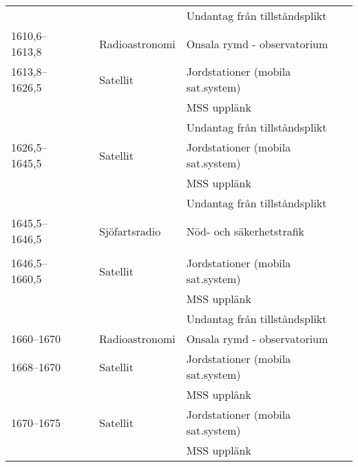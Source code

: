 \begin{landscape}
\begin{longtable}{llll}
	                   &                    &                         & Undantag från tillståndsplikt         \\
	1610,6--1613,8     &                    & Radioastronomi          & Onsala rymd - observatorium           \\
	1613,8--1626,5     &                    & Satellit                & Jordstationer (mobila sat.system)     \\
	                   &                    &                         & MSS upplänk                           \\
	                   &                    &                         & Undantag från tillståndsplikt         \\
	1626,5--1645,5     &                    & Satellit                & Jordstationer (mobila sat.system)     \\
	                   &                    &                         & MSS upplänk                           \\
	                   &                    &                         & Undantag från tillståndsplikt         \\
	1645,5--1646,5     &                    & Sjöfartsradio           & Nöd- och säkerhetstrafik              \\
	                   &                    &                         &                                       \\
	1646,5--1660,5     &                    & Satellit                & Jordstationer (mobila sat.system)     \\
	                   &                    &                         & MSS upplänk                           \\
	                   &                    &                         & Undantag från tillståndsplikt         \\
	1660--1670         &                    & Radioastronomi          & Onsala rymd - observatorium           \\
	1668--1670         &                    & Satellit                & Jordstationer (mobila sat.system)     \\
	                   &                    &                         & MSS upplänk                           \\
	1670--1675         &                    & Satellit                & Jordstationer (mobila sat.system)     \\
	                   &                    &                         & MSS upplänk                           \\

\end{longtable}
\end{landscape}
